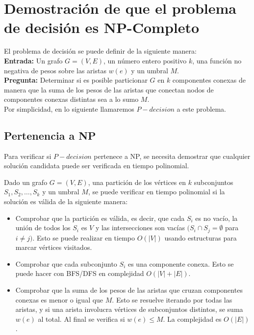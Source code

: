 \documentclass[a4paper, 12pt]{article}
\begin{document}
\section{Demostración de que el problema de decisión es NP-Completo}

El problema de decisión se puede definir de la 
siguiente manera: \\

\textbf{Entrada:} Un grafo \( G = (V, E) \), un número entero positivo \( k \), 
una función no negativa de pesos sobre las aristas $w(e)$ 
y un umbral \( M \).\\

\textbf{Pregunta:} Determinar si es posible 
particionar \( G \) en \( k \) componentes conexas de 
manera que la suma de los pesos de las aristas que conectan nodos de 
componentes conexas distintas sea a lo sumo \( M \).\\

Por simplicidad, en lo siguiente llamaremos $P-decision$ a este problema. 

\subsection{Pertenencia a NP}

Para verificar si $P-decision$ pertenece a NP, 
se necesita demostrar que cualquier solución candidata 
puede ser verificada en tiempo polinomial.

Dado un grafo \( G = (V, E) \), una partición de los 
vértices en \( k \) subconjuntos $S_1, S_2, \ldots, S_k$ y un 
umbral \( M \), se puede verificar en tiempo 
polinomial si la solución es válida de la siguiente 
manera:

\begin{itemize}
    \item Comprobar que la partición es válida, es decir, que cada $S_i$ es no vacío, la unión de todos los $S_i$ es $V$ y las intersecciones son vacías $(S_i \cap  S_j = \emptyset$ para $ i \neq j)$. Esto se puede realizar en tiempo \( O(|V|) \) usando estructuras para marcar vértices visitados.
    \item Comprobar que cada subconjunto $S_i$ es una componente conexa. Esto se puede hacer con BFS/DFS en complejidad $O(|V|+|E|)$.
    \item Comprobar que la suma de los pesos de las aristas que cruzan componentes conexas es menor o igual que $M$. Esto se resuelve iterando por todas las aristas, y si una arista involucra vértices de subconjuntos distintos, se suma $w(e)$ al total. Al final se verifica si $w(e) \leq M$. La complejidad es $O(|E|)$.
\end{itemize}
\end{document}
